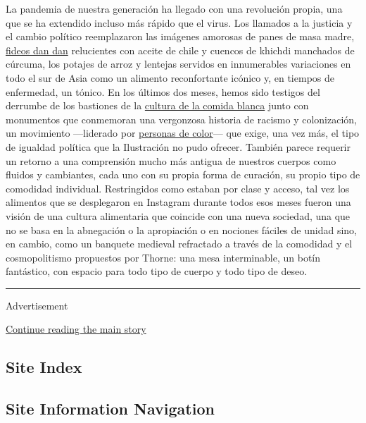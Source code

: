 La pandemia de nuestra generación ha llegado con una revolución propia,
una que se ha extendido incluso más rápido que el virus. Los llamados a
la justicia y el cambio político reemplazaron las imágenes amorosas de
panes de masa madre,
\href{https://cooking.nytimes3xbfgragh.onion/recipes/7002-dan-dan-noodles}{fideos
dan dan} relucientes con aceite de chile y cuencos de khichdi manchados
de cúrcuma, los potajes de arroz y lentejas servidos en innumerables
variaciones en todo el sur de Asia como un alimento reconfortante
icónico y, en tiempos de enfermedad, un tónico. En los últimos dos
meses, hemos sido testigos del derrumbe de los bastiones de la
\href{https://www.nytimes3xbfgragh.onion/2020/06/29/dining/john-t-edge-southern-foodways-alliance.html}{cultura
de la comida blanca} junto con monumentos que conmemoran una vergonzosa
historia de racismo y colonización, un movimiento ---liderado por
\href{https://www.nytimes3xbfgragh.onion/es/2020/06/16/espanol/mundo/bipoc-que-es.html}{personas
de color}--- que exige, una vez más, el tipo de igualdad política que la
Ilustración no pudo ofrecer. También parece requerir un retorno a una
comprensión mucho más antigua de nuestros cuerpos como fluidos y
cambiantes, cada uno con su propia forma de curación, su propio tipo de
comodidad individual. Restringidos como estaban por clase y acceso, tal
vez los alimentos que se desplegaron en Instagram durante todos esos
meses fueron una visión de una cultura alimentaria que coincide con una
nueva sociedad, una que no se basa en la abnegación o la apropiación o
en nociones fáciles de unidad sino, en cambio, como un banquete medieval
refractado a través de la comodidad y el cosmopolitismo propuestos por
Thorne: una mesa interminable, un botín fantástico, con espacio para
todo tipo de cuerpo y todo tipo de deseo.

\begin{center}\rule{0.5\linewidth}{\linethickness}\end{center}

Advertisement

\protect\hyperlink{after-bottom}{Continue reading the main story}

\hypertarget{site-index}{%
\subsection{Site Index}\label{site-index}}

\hypertarget{site-information-navigation}{%
\subsection{Site Information
Navigation}\label{site-information-navigation}}

